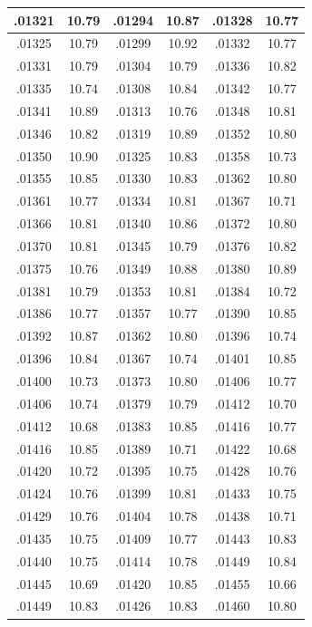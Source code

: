 \documentclass[10pt,twoside]{report}
\begin{document}
\begin{appendices}
\begin{longtable}{|c|c||c|c||c|c|}
.01321 & 10.79 & .01294 & 10.87 & .01328 & 10.77\\\hline
.01325 & 10.79 & .01299 & 10.92 & .01332 & 10.77\\\hline
.01331 & 10.79 & .01304 & 10.79 & .01336 & 10.82\\\hline
.01335 & 10.74 & .01308 & 10.84 & .01342 & 10.77\\\hline
.01341 & 10.89 & .01313 & 10.76 & .01348 & 10.81\\\hline
.01346 & 10.82 & .01319 & 10.89 & .01352 & 10.80\\\hline
.01350 & 10.90 & .01325 & 10.83 & .01358 & 10.73\\\hline
.01355 & 10.85 & .01330 & 10.83 & .01362 & 10.80\\\hline
.01361 & 10.77 & .01334 & 10.81 & .01367 & 10.71\\\hline
.01366 & 10.81 & .01340 & 10.86 & .01372 & 10.80\\\hline
.01370 & 10.81 & .01345 & 10.79 & .01376 & 10.82\\\hline
.01375 & 10.76 & .01349 & 10.88 & .01380 & 10.89\\\hline
.01381 & 10.79 & .01353 & 10.81 & .01384 & 10.72\\\hline
.01386 & 10.77 & .01357 & 10.77 & .01390 & 10.85\\\hline
.01392 & 10.87 & .01362 & 10.80 & .01396 & 10.74\\\hline
.01396 & 10.84 & .01367 & 10.74 & .01401 & 10.85\\\hline
.01400 & 10.73 & .01373 & 10.80 & .01406 & 10.77\\\hline
.01406 & 10.74 & .01379 & 10.79 & .01412 & 10.70\\\hline
.01412 & 10.68 & .01383 & 10.85 & .01416 & 10.77\\\hline
.01416 & 10.85 & .01389 & 10.71 & .01422 & 10.68\\\hline
.01420 & 10.72 & .01395 & 10.75 & .01428 & 10.76\\\hline
.01424 & 10.76 & .01399 & 10.81 & .01433 & 10.75\\\hline
.01429 & 10.76 & .01404 & 10.78 & .01438 & 10.71\\\hline
.01435 & 10.75 & .01409 & 10.77 & .01443 & 10.83\\\hline
.01440 & 10.75 & .01414 & 10.78 & .01449 & 10.84\\\hline
.01445 & 10.69 & .01420 & 10.85 & .01455 & 10.66\\\hline
.01449 & 10.83 & .01426 & 10.83 & .01460 & 10.80\\\hline

\end{longtable}
\end{appendices}
\end{document}
